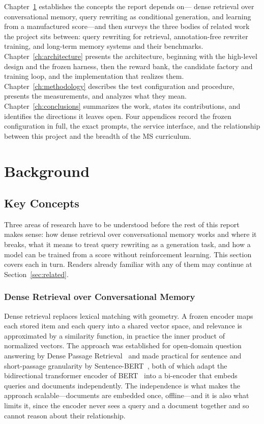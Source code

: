 \documentclass[12pt,letterpaper,oneside]{report}
\begin{document}
Chapter~\ref{ch:background} establishes the concepts the report depends on---%
dense retrieval over conversational memory, query rewriting as conditional
generation, and learning from a manufactured score---and then surveys the three
bodies of related work the project sits between: query rewriting for retrieval,
annotation-free rewriter training, and long-term memory systems and their
benchmarks. Chapter~\ref{ch:architecture} presents the architecture, beginning
with the high-level design and the frozen harness, then the reward bank, the
candidate factory and training loop, and the implementation that realizes them.
Chapter~\ref{ch:methodology} describes the test configuration and procedure,
presents the measurements, and analyzes what they mean.
Chapter~\ref{ch:conclusions} summarizes the work, states its contributions, and
identifies the directions it leaves open. Four appendices record the frozen
configuration in full, the exact prompts, the service interface, and the
relationship between this project and the breadth of the MS curriculum.

\chapter{Background}
\label{ch:background}

\section{Key Concepts}
\label{sec:concepts}

Three areas of research have to be understood before the rest of this report
makes sense: how dense retrieval over conversational memory works and where it
breaks, what it means to treat query rewriting as a generation task, and how a
model can be trained from a score without reinforcement learning. This section
covers each in turn. Readers already familiar with any of them may continue at
Section~\ref{sec:related}.

\subsection{Dense Retrieval over Conversational Memory}
\label{sec:concept-retrieval}

Dense retrieval replaces lexical matching with geometry. A frozen encoder maps
each stored item and each query into a shared vector space, and relevance is
approximated by a similarity function, in practice the inner product of
normalized vectors. The approach was established for open-domain question
answering by Dense Passage Retrieval~\cite{dpr} and made practical for sentence
and short-passage granularity by Sentence-BERT~\cite{sbert}, both of which
adapt the bidirectional transformer encoder of BERT~\cite{bert} into a
bi-encoder that embeds queries and documents independently. The independence is
what makes the approach scalable---documents are embedded once, offline---and
it is also what limits it, since the encoder never sees a query and a document
together and so cannot reason about their relationship.
\end{document}
